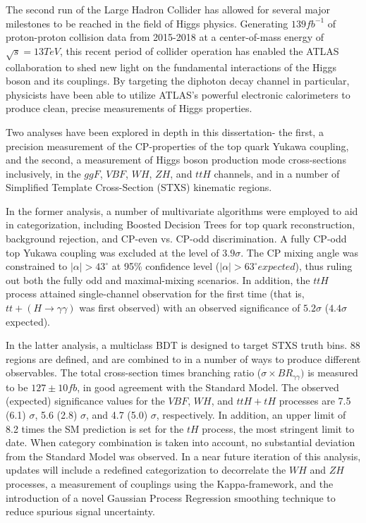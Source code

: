The second run of the Large Hadron Collider has allowed for several major milestones to be reached in the field of Higgs physics. Generating $139 fb^{-1}$ of proton-proton collision data from 2015-2018 at a center-of-mass energy of $\sqrt{s} = 13 TeV$, this recent period of collider operation has enabled the ATLAS collaboration to shed new light on the fundamental interactions of the Higgs boson and its couplings. By targeting the diphoton decay channel in particular, physicists have been able to utilize ATLAS's powerful electronic calorimeters to produce clean, precise measurements of Higgs properties.

Two analyses have been explored in depth in this dissertation- the first, a precision measurement of the CP-properties of the top quark Yukawa coupling, and the second, a measurement of Higgs boson production mode cross-sections inclusively, in the $ggF$, $VBF$, $WH$, $ZH$, and $ttH$ channels, and in a number of Simplified Template Cross-Section (STXS) kinematic regions.

In the former analysis, a number of multivariate algorithms were employed to aid in categorization, including Boosted Decision Trees for top quark reconstruction, background rejection, and CP-even vs. CP-odd discrimination. A fully CP-odd top Yukawa coupling was excluded at the level of $3.9 \sigma$. The CP mixing angle was constrained to $|\alpha| > 43^{\circ}$ at 95\% confidence level ($|\alpha| > 63^{\circ} expected$), thus ruling out both the fully odd and maximal-mixing scenarios. In addition, the $ttH$ process attained single-channel observation for the first time (that is, $tt+(H \rightarrow \gamma \gamma)$ was first observed) with an observed significance of $5.2 \sigma$ ($4.4 \sigma$ expected). 

In the latter analysis, a multiclass BDT is designed to target STXS truth bins. 88 regions are defined, and are combined to in a number of ways to produce different observables. The total cross-section times branching ratio ($\sigma \times BR_{\gamma \gamma})$ is measured to be $127\pm 10 fb$, in good agreement with the Standard Model. The observed (expected) significance values for the $VBF$, $WH$, and $ttH+tH$ processes are 7.5 (6.1) $\sigma$, 5.6 (2.8) $\sigma$, and 4.7 (5.0) $\sigma$, respectively. In addition, an upper limit of 8.2 times the SM prediction is set for the $tH$ process, the most stringent limit to date. When category combination is taken into account, no substantial deviation from the Standard Model was observed. In a near future iteration of this analysis, updates will include a redefined categorization to decorrelate the $WH$ and $ZH$ processes, a measurement of couplings using the Kappa-framework, and the introduction of a novel Gaussian Process Regression smoothing technique to reduce spurious signal uncertainty.

